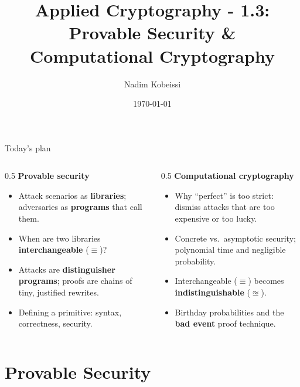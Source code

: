 \ifdefined\PRESENTATION\else\PassOptionsToClass{handout}{beamer}\fi\documentclass[aspectratio=169, lualatex]{beamer}
\title{Applied Cryptography - 1.3: Provable Security \& Computational Cryptography}
\author{Nadim Kobeissi}
\institute{Symbolic Software}
\date{\today}
\begin{document}
\begin{frame}[plain]
	\titlepage
\end{frame}

\begin{frame}{Today's plan}
	\begin{columns}[c]
		\begin{column}{0.5\textwidth}
			\textbf{Provable security}
			\begin{itemize}
				\item Attack scenarios as \textbf{libraries}; adversaries as \textbf{programs} that call them.
				\item When are two libraries \textbf{interchangeable} ($\equiv$)?
				\item Attacks are \textbf{distinguisher programs}; proofs are chains of tiny, justified rewrites.
				\item Defining a primitive: syntax, correctness, security.
			\end{itemize}
		\end{column}
		\begin{column}{0.5\textwidth}
			\textbf{Computational cryptography}
			\begin{itemize}
				\item Why ``perfect'' is too strict: dismiss attacks that are too expensive or too lucky.
				\item Concrete vs.\ asymptotic security; polynomial time and negligible probability.
				\item Interchangeable ($\equiv$) becomes \textbf{indistinguishable} ($\approxeq$).
				\item Birthday probabilities and the \textbf{bad event} proof technique.
			\end{itemize}
		\end{column}
	\end{columns}
\end{frame}

\section{Provable Security}
\end{document}
